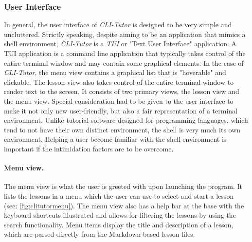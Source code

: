 \subsubsection{User Interface} In general, the user interface of
\textit{CLI-Tutor} is designed to be very simple and uncluttered. Strictly
speaking, despite aiming to be an application that mimics a shell environment,
\textit{CLI-Tutor} is a \textit{TUI} or "Text User Interface" application. A
TUI application is a command line application that typically takes control of
the entire terminal window and may contain some graphical elements. In the case
of \textit{CLI-Tutor}, the menu view contains a graphical list that is
"hoverable" and clickable. The lesson view also takes control of the entire
terminal window to render text to the screen.  It consists of two primary
views, the lesson view and the menu view. Special consideration had to be given
to the user interface to make it not only new user-friendly, but also a fair
representation of a terminal environment. Unlike tutorial software designed for
programming languages, which tend to not have their own distinct environment,
the shell is very much its own environment. Helping a user become familiar with
the shell environment is important if the intimidation factors are to be
overcome.

\paragraph{Menu view.} The menu view is what the user is greeted with upon
launching the program. It lists the lessons in a menu which the user can use to
select and start a lesson (see: \autoref{fig:clitutormenu}). The menu view also
has a help bar at the base with the keyboard shortcuts illustrated and allows
for filtering the lessons by using the search functionality. Menu items display
the title and description of a lesson, which are parsed directly from the
Markdown-based lesson files.

